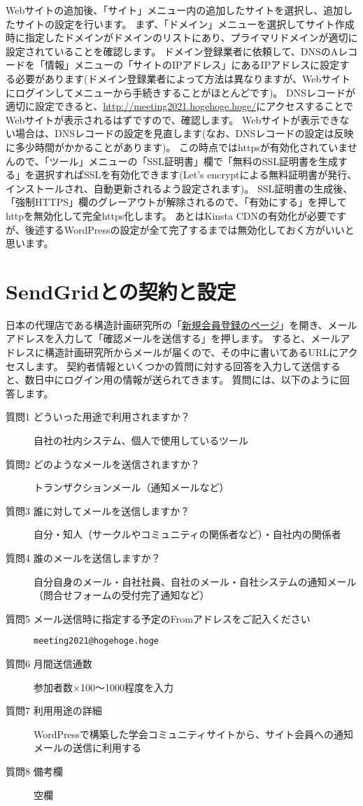 \documentclass[titlepage,10pt,a4paper,uplatex]{jsbook}
\begin{document}
Webサイトの追加後、「サイト」メニュー内の追加したサイトを選択し、追加したサイトの設定を行います。
まず、「ドメイン」メニューを選択してサイト作成時に指定したドメインがドメインのリストにあり、プライマリドメインが適切に設定されていることを確認します。
ドメイン登録業者に依頼して、DNSのAレコードを「情報」メニューの「サイトのIPアドレス」にあるIPアドレスに設定する必要があります(ドメイン登録業者によって方法は異なりますが、Webサイトにログインしてメニューから手続きすることがほとんどです)。
DNSレコードが適切に設定できると、\url{http://meeting2021.hogehoge.hoge/}にアクセスすることでWebサイトが表示されるはずですので、確認します。
Webサイトが表示できない場合は、DNSレコードの設定を見直します(なお、DNSレコードの設定は反映に多少時間がかかることがあります)。
この時点ではhttpsが有効化されていませんので、「ツール」メニューの「SSL証明書」欄で「無料のSSL証明書を生成する」を選択すればSSLを有効化できます(Let's encryptによる無料証明書が発行、インストールされ、自動更新されるよう設定されます)。
SSL証明書の生成後、「強制HTTPS」欄のグレーアウトが解除されるので、「有効にする」を押してhttpを無効化して完全https化します。
あとはKinsta CDNの有効化が必要ですが、後述するWordPressの設定が全て完了するまでは無効化しておく方がいいと思います。

\section{SendGridとの契約と設定}

日本の代理店である構造計画研究所の「\href{https://sendgrid.kke.co.jp/app?p=signup.index}{新規会員登録のページ}」を開き、メールアドレスを入力して「確認メールを送信する」を押します。
すると、メールアドレスに構造計画研究所からメールが届くので、その中に書いてあるURLにアクセスします。
契約者情報といくつかの質問に対する回答を入力して送信すると、数日中にログイン用の情報が送られてきます。
質問には、以下のように回答します。

\begin{description}
\item[質問1 どういった用途で利用されますか？] 自社の社内システム、個人で使用しているツール
\item[質問2 どのようなメールを送信されますか？] トランザクションメール（通知メールなど）
\item[質問3 誰に対してメールを送信しますか？] 自分・知人（サークルやコミュニティの関係者など）・自社内の関係者
\item[質問4 誰のメールを送信しますか？] 自分自身のメール・自社社員、自社のメール・自社システムの通知メール（問合せフォームの受付完了通知など）
\item[質問5 メール送信時に指定する予定のFromアドレスをご記入ください] \texttt{meeting2021@hogehoge.hoge}
\item[質問6 月間送信通数] 参加者数×100～1000程度を入力
\item[質問7 利用用途の詳細] WordPressで構築した学会コミュニティサイトから、サイト会員への通知メールの送信に利用する
\item[質問8 備考欄] 空欄
\end{description}
\end{document}
